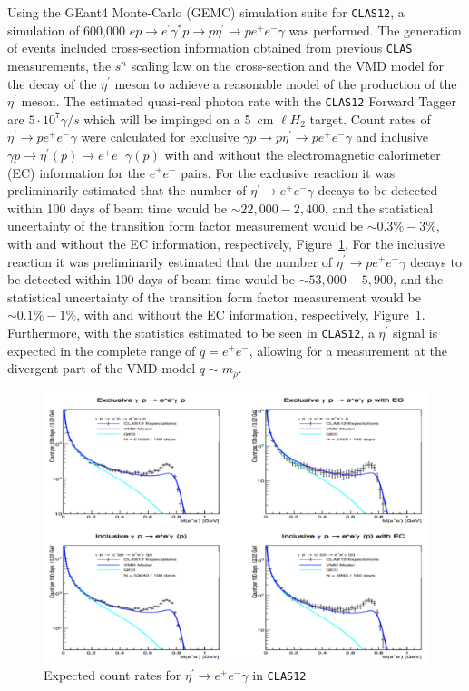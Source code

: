 \documentclass{aip-cp}
\begin{document}
Using the GEant4 Monte-Carlo (GEMC) simulation suite for \textsc{\texttt{CLAS12}}, a simulation of 600,000 $e p \to e^{\prime} \gamma^* p \to p \eta^{\prime}  \to p e^+ e^- \gamma $ was performed. The generation of events included cross-section information obtained from previous \textsc{\texttt{CLAS}} measurements, the $s^n$ scaling law on the cross-section and the VMD model for the decay of the $\eta^{\prime}$ meson to achieve a reasonable model of the production of the $\eta^{\prime} $ meson. The estimated quasi-real photon rate with the \textsc{\texttt{CLAS12}} Forward Tagger are $5 \cdot 10^7 \gamma / s$ which will be impinged on  a 5~cm $\ell H_2$ target. Count rates of $ \eta^{\prime}  \to p e^+ e^- \gamma $ were calculated for exclusive $\gamma p \to p \eta^{\prime}  \to p e^+ e^- \gamma $ and inclusive $\gamma p \to \eta^{\prime} (p)  \to  e^+ e^- \gamma (p) $ with and without the electromagnetic calorimeter (EC) information for the $ e^+ e^- $ pairs. For the exclusive reaction it was preliminarily estimated that the number of  $ \eta^{\prime}  \to e^+ e^- \gamma $ decays to be detected within 100 days of beam time would be $\sim 22,000 - 2,400$, and the statistical uncertainty of the transition form factor measurement would be $\sim 0.3 \% - 3 \%$, with and without the EC information, respectively, Figure~\ref{fig:clas12_etaP}. For the inclusive reaction it was preliminarily estimated that the number of  $ \eta^{\prime}  \to p e^+ e^- \gamma $ decays to be detected within 100 days of beam time would be $\sim 53,000 - 5,900$, and the statistical uncertainty of the transition form factor measurement would be $\sim 0.1 \% - 1 \%$, with and without the EC information, respectively, Figure~\ref{fig:clas12_etaP}. Furthermore, with the statistics estimated to be seen in \textsc{\texttt{CLAS12}}, a $ \eta^{\prime} $ signal is expected in the complete range of $q = e^+ e^- $, allowing for a measurement at the divergent part of the VMD model $q\sim m_{\rho}$. 
\begin{figure}[h!]
	\centerline{\includegraphics[width=350 pt, height=255 pt]{figures/clas12_etaP.pdf}}
	\caption{Expected count rates for $ \eta^{\prime}  \to e^+ e^- \gamma $ in \textsc{\texttt{CLAS12}}}
	\label{fig:clas12_etaP}
\end{figure}
\end{document}
